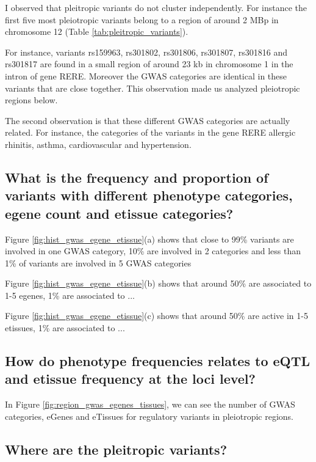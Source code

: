 I observed that pleitropic variants do not cluster independently.
%
For instance the first five most pleiotropic variants belong to a region of around 2 MBp in chromosome 12 (Table \ref{tab:pleitropic_variants}).

For instance, variants rs159963, rs301802, rs301806, rs301807, rs301816 and rs301817 are found in a small region of around 23 kb in chromosome 1 in the intron of gene RERE.
Moreover the GWAS categories are identical in these variants that are close together.
This observation made us analyzed pleiotropic regions below.

The second observation is that these different GWAS categories are actually related.
For instance, the categories of the variants in the gene RERE allergic rhinitis, asthma, cardiovascular and hypertension.

\subsection*{What is the frequency and proportion of variants with different phenotype categories, egene count and etissue categories?}

Figure \ref{fig:hist_gwas_egene_etissue}(a) shows that close to 99\% variants are involved in one GWAS category, 10\% are involved in 2 categories and less than 1\% of variants are involved in 5 GWAS categories

Figure \ref{fig:hist_gwas_egene_etissue}(b) shows that around 50\% are associated to 1-5 egenes, 1\% are associated to ...

Figure \ref{fig:hist_gwas_egene_etissue}(c) shows that around 50\% are active in 1-5 etissues, 1\% are associated to ...

\subsection*{How do phenotype frequencies relates to eQTL and etissue frequency at the loci level?}

In Figure \ref{fig:region_gwas_egenes_tissues}, we can see the number of GWAS categories, eGenes and eTissues for regulatory variants in pleiotropic regions.

\subsection*{Where are the pleitropic variants?}

